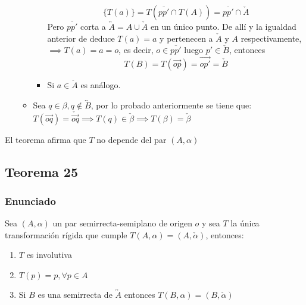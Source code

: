 \documentclass[a4paper]{article}
\begin{document}
\begin{itemize}
\begin{itemize}
\begin{itemize}
            \begin{equation*}
              \{T(a)\}=T(\overline{pp'}\cap T(A))=\overline{pp'}\cap \check{A}
            \end{equation*}
            Pero $\overline{pp'}$ corta a $\overleftrightarrow{A}=A\cup \check{A}$ en un único punto. De allí y la igualdad anterior de deduce $T(a)=a$ y pertenecen a $\check{A}$ y $A$ respectivamente, $\implies T(a)=a=o$, es decir, $o \in \overline{pp'}$ luego $p' \in \check{B}$, entonces
            \begin{equation*}
              T(B)=T(\overrightarrow{op})=\overrightarrow{op'}=\check{B}
            \end{equation*}
            \item Si $a \in \check{A}$ es análogo.
        \end{itemize}
        \item Sea $q \in \beta, q \notin \overleftrightarrow{B}$, por lo probado anteriormente se tiene que: $T(\overrightarrow{oq})=\check{\overrightarrow{oq}} \implies T(q) \in \check{\beta} \implies T(\beta)=\check{\beta}$
    \end{itemize} 
\end{itemize}
El teorema afirma que $T$ no depende del par $(A,\alpha)$
\subsection{Teorema 25}
\subsubsection{Enunciado}
Sea $(A, \alpha)$ un par semirrecta-semiplano de origen $o$ y sea $T$ la única transformación rígida que cumple $T(A,\alpha)=(A,\check{\alpha})$, entonces:
\begin{enumerate}
    \item $T$ es involutiva
    \item $T(p)=p, \forall p \in A$
    \item Si $B$ es una semirrecta de $\overleftrightarrow{A}$ entonces $T(B,\alpha)=(B,\check{\alpha})$
\end{enumerate}
\end{document}
